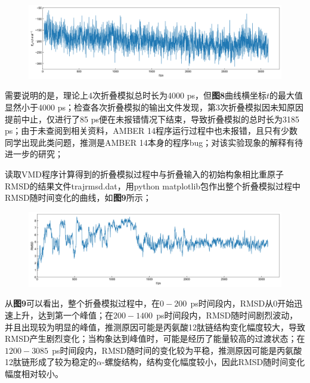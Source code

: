 \documentclass[12pt]{article}
\begin{document}
\begin{figure}[h]
	\centering
	\includegraphics[width=1.0\textwidth]{ep_md.jpg}
\end{figure}
需要说明的是，理论上4次折叠模拟总时长为4000 ps，但\textbf{图8}曲线横坐标$t$的最大值显然小于4000 ps；检查各次折叠模拟的输出文件发现，第3次折叠模拟因未知原因提前中止，仅进行了85 ps便在未报错情况下结束，导致折叠模拟的总时长为3185 ps；由于未查阅到相关资料，AMBER 14程序运行过程中也未报错，且只有少数同学出现此类问题，推测是AMBER 14本身的程序bug；对该实验现象的解释有待进一步的研究；\par
读取VMD程序计算得到的折叠模拟过程中与折叠输入的初始构象相比重原子RMSD的结果文件trajrmsd.dat，用python matplotlib包作出整个折叠模拟过程中RMSD随时间变化的曲线，如\textbf{图9}所示；
\begin{figure}[h]
	\centering
	\includegraphics[width=1.0\textwidth]{rmsd.jpg}
\end{figure}
\par
从\textbf{图9}可以看出，整个折叠模拟过程中，在$0-200\ \ $ps时间段内，RMSD从$0$开始迅速上升，达到第一个峰值；在$200-1400\ \ $ps时间段内，RMSD随时间剧烈波动，并且出现较为明显的峰值，推测原因可能是丙氨酸12肽链结构变化幅度较大，导致RMSD产生剧烈变化；当构象达到峰值时，可能是经历了能量较高的过渡状态；在$1200-3085\ \ $ps时间段内，RMSD随时间的变化较为平稳，推测原因可能是丙氨酸12肽链形成了较为稳定的$\alpha$-螺旋结构，结构变化幅度较小，因此RMSD随时间变化幅度相对较小。
 		
 		
\end{document}
